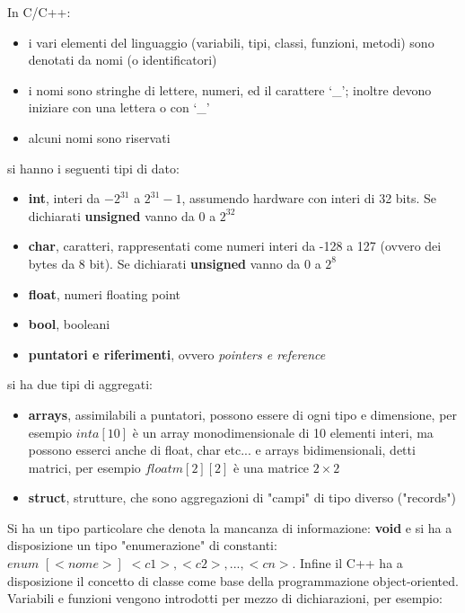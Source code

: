 \documentclass[a4paper,12pt, oneside]{book}
\begin{document}
In C/C++:
\begin{itemize}
	\item i vari elementi del linguaggio (variabili, tipi, classi, funzioni, metodi) sono denotati da nomi (o identificatori)
	\item i nomi sono stringhe di lettere, numeri, ed il carattere ‘\_'; inoltre devono iniziare con una lettera o con ‘\_'
	\item alcuni nomi sono riservati
\end{itemize}
\newpage
si hanno i seguenti tipi di dato:
\begin{itemize}
	\item \textbf{int}, interi da $-2^{31}$ a $2^{31}-1$, assumendo hardware con interi di 32 bits. Se dichiarati \textbf{unsigned} vanno da $0$ a $2^32$
	\item \textbf{char}, caratteri, rappresentati come numeri interi da -128 a 127 (ovvero dei
	      bytes da 8 bit). Se dichiarati \textbf{unsigned} vanno da $0 $ a $2^8$
	\item \textbf{float}, numeri floating point
	\item \textbf{bool}, booleani
	\item \textbf{puntatori e riferimenti}, ovvero \textit{pointers e reference}
\end{itemize}
si ha due tipi di aggregati:
\begin{itemize}
	\item \textbf{arrays}, assimilabili a puntatori, possono essere di ogni tipo e dimensione, per esempio $int a[10]$ è un array monodimensionale di 10 elementi interi, ma possono esserci anche di float, char etc... e arrays bidimensionali, detti matrici, per esempio $float m[2][2]$ è una matrice $2\times 2$
	\item \textbf{struct}, strutture, che sono aggregazioni di "campi" di tipo diverso ("records")
\end{itemize}
Si ha un tipo particolare che denota la mancanza di informazione: \textbf{void} e si ha a disposizione un tipo "enumerazione" di constanti: \\$enum\,\, [<nome>]\,\, { <c1>, <c2>, ..., <cn> }$. Infine il C++ ha a disposizione il concetto di classe come base della programmazione object-oriented.		\\
	Variabili e funzioni vengono introdotti per mezzo di dichiarazioni, per esempio:
\end{document}
